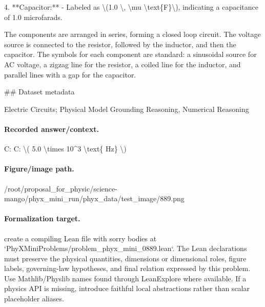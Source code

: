 4. **Capacitor:**
   - Labeled as \textbackslash{}(1.0 \textbackslash{}, \textbackslash{}mu \textbackslash{}text\{F\}\textbackslash{}), indicating a capacitance of 1.0 microfarads.

The components are arranged in series, forming a closed loop circuit. The voltage source is connected to the resistor, followed by the inductor, and then the capacitor. The symbols for each component are standard: a sinusoidal source for AC voltage, a zigzag line for the resistor, a coiled line for the inductor, and parallel lines with a gap for the capacitor.

\#\# Dataset metadata

Electric Circuits; Physical Model Grounding Reasoning, Numerical Reasoning

\paragraph{Recorded answer/context.}
C: C: \textbackslash{}( 5.0 \textbackslash{}times 10\textasciicircum{}3 \textbackslash{}text\{ Hz\} \textbackslash{})

\paragraph{Figure/image path.}
/root/proposal\_for\_physic/science-mango/phyx\_mini\_run/phyx\_data/test\_image/889.png

\paragraph{Formalization target.}
create a compiling Lean file with sorry bodies at `PhyXMiniProblems/problem\_phyx\_mini\_0889.lean`. The Lean declarations must preserve the physical quantities, dimensions or dimensional roles, figure labels, governing-law hypotheses, and final relation expressed by this problem.
Use Mathlib/Physlib names found through LeanExplore where available. If a physics API is missing, introduce faithful local abstractions rather than scalar placeholder aliases.

